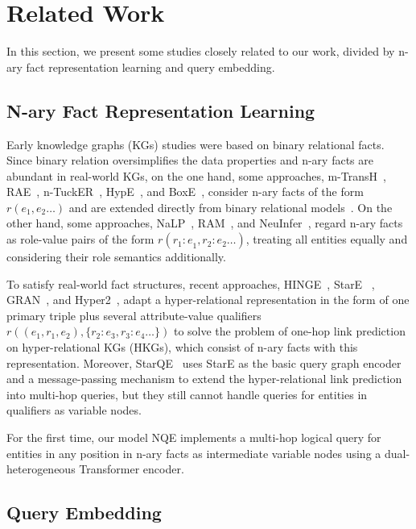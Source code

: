 \documentclass[letterpaper]{article} \usepackage{aaai23}  \usepackage{times}  \usepackage{helvet}  \usepackage{courier}  \usepackage[hyphens]{url}  \usepackage{graphicx} \urlstyle{rm} \def\UrlFont{\rm}  \usepackage{natbib}  \usepackage{caption} \frenchspacing  \setlength{\pdfpagewidth}{8.5in}  \setlength{\pdfpageheight}{11in}  \usepackage{algorithm}
\begin{document}
\section{Related Work}
In this section, we present some studies closely related to our work, divided by n-ary fact representation learning and query embedding.
\subsection{N-ary Fact Representation Learning} 
Early knowledge graphs (KGs) studies were based on binary relational facts. Since binary relation oversimplifies the data properties and n-ary facts are abundant in real-world KGs, on the one hand, some approaches, m-TransH~\citep{m-TransH}, RAE~\citep{RAE}, n-TuckER~\citep{n-TuckER}, HypE~\citep{HypE}, and BoxE~\citep{BoxE}, consider n-ary facts of the form $r(e_1,e_2\ldots)$ and are extended directly from binary relational models~\citep{TransH, TuckER, SimplE}. On the other hand, some approaches, NaLP~\citep{NaLP}, RAM~\citep{RAM}, and NeuInfer~\citep{NeuInfer}, regard n-ary facts as role-value pairs of the form $r({r_1:e}_1,r_2:e_2\ldots)$, treating all entities equally and considering their role semantics additionally. 

To satisfy real-world fact structures, recent approaches, HINGE~\citep{HINGE}, StarE ~\citep{StarE}, GRAN~\citep{GRAN}, and Hyper2~\citep{Hyper2}, adapt a hyper-relational representation in the form of one primary triple plus several attribute-value qualifiers $r((e_1,r_1,e_2),\{r_2:e_3,r_3:e_4\ldots\})$ to solve the problem of one-hop link prediction on hyper-relational KGs (HKGs), which consist of n-ary facts with this representation. Moreover, StarQE~\citep{StarQE} uses StarE as the basic query graph encoder and a message-passing mechanism to extend the hyper-relational link prediction into multi-hop queries, but they still cannot handle queries for entities in qualifiers as variable nodes. 

For the first time, our model NQE implements a multi-hop logical query for entities in any position in n-ary facts as intermediate variable nodes using a dual-heterogeneous Transformer encoder.


\subsection{Query Embedding}
\end{document}
